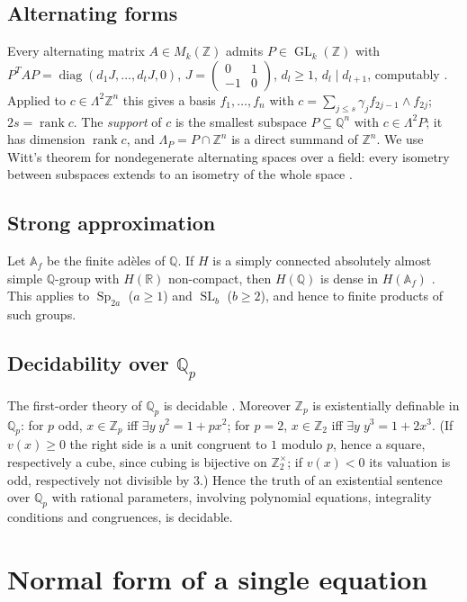 \documentclass[11pt]{amsart}
\theoremstyle{definition}
\theoremstyle{remark}
\newcommand{\Z}{\mathbb{Z}}
\newcommand{\Q}{\mathbb{Q}}
\newcommand{\R}{\mathbb{R}}
\newcommand{\A}{\mathbb{A}}
\newcommand{\Zp}{\mathbb{Z}_p}
\newcommand{\Qp}{\mathbb{Q}_p}
\newcommand{\w}{\wedge}
\newcommand{\Sp}{\operatorname{Sp}}
\newcommand{\SL}{\operatorname{SL}}
\newcommand{\GL}{\operatorname{GL}}
\newcommand{\rank}{\operatorname{rank}}
\begin{document}
\subsection{Alternating forms}
Every alternating matrix $A\in M_k(\Z)$ admits $P\in\GL_k(\Z)$ with
$P^{T}AP=\operatorname{diag}(d_1J,\dots,d_tJ,0)$, $J=\left(\begin{smallmatrix}0&1\\-1&0\end{smallmatrix}\right)$,
$d_l\ge1$, $d_l\mid d_{l+1}$, computably \cite[Thm.~IV.1]{New}. Applied to
$c\in\Lambda^2\Z^n$ this gives a basis $f_1,\dots,f_n$ with
$c=\sum_{j\le s}\gamma_j f_{2j-1}\w f_{2j}$; $2s=\rank c$. The \emph{support} of $c$
is the smallest subspace $P\subseteq\Q^n$ with $c\in\Lambda^2P$; it has dimension
$\rank c$, and $\Lambda_P=P\cap\Z^n$ is a direct summand of $\Z^n$.
We use Witt's theorem for nondegenerate alternating spaces over a field: every
isometry between subspaces extends to an isometry of the whole space
\cite[Thm.~3.9]{Art}.

\subsection{Strong approximation}
Let $\A_f$ be the finite ad\`eles of $\Q$. If $H$ is a simply connected
absolutely almost simple $\Q$-group with $H(\R)$ non-compact, then $H(\Q)$ is dense
in $H(\A_f)$ \cite[Thm.~7.12]{PR}. This applies to $\Sp_{2a}$ ($a\ge1$) and
$\SL_b$ ($b\ge2$), and hence to finite products of such groups.

\subsection{Decidability over \texorpdfstring{$\Qp$}{Qp}}
The first-order theory of $\Qp$ is decidable \cite{AK,Ers}. Moreover $\Zp$ is
existentially definable in $\Qp$: for $p$ odd, $x\in\Zp$ iff $\exists y\;
y^2=1+px^2$; for $p=2$, $x\in\Z_2$ iff $\exists y\; y^3=1+2x^3$. (If $v(x)\ge0$ the
right side is a unit congruent to $1$ modulo $p$, hence a square, respectively a
cube, since cubing is bijective on $\Z_2^\times$; if $v(x)<0$ its valuation is odd,
respectively not divisible by $3$.) Hence the truth of an existential sentence
over $\Qp$ with rational parameters, involving polynomial equations, integrality
conditions and congruences, is decidable.

\section{Normal form of a single equation}\label{sec:normal}
\end{document}
